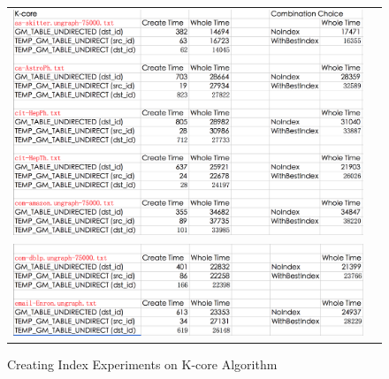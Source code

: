 \begin{figure}[H]
\begin{center}
\begin{tabular}{cc}
     \includegraphics[width=1.0\textwidth]{FIG/KC1.png} \\
     \includegraphics[width=1.0\textwidth]{FIG/KC2.png} \\
\end{tabular}
\caption{Creating Index Experiments on K-core Algorithm}
\end{center}
\end{figure}

